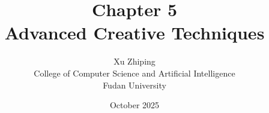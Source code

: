 \documentclass[11pt,letterpaper]{book}
\begin{document}
\title{Chapter 5\\
\large Advanced Creative Techniques}
\author{Xu Zhiping\\
\small College of Computer Science and Artificial Intelligence\\
\small Fudan University}
\date{October 2025}
\maketitle

\tableofcontents

\setcounter{chapter}{4}




\printindex
\end{document}
